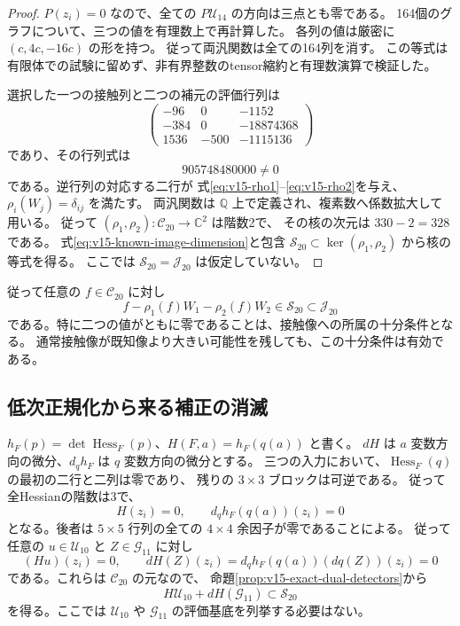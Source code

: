 \begin{proof}
$P(z_i)=0$ なので、全ての $P\mathcal U_{14}$ の方向は三点とも零である。
164個のグラフについて、三つの値を有理数上で再計算した。
各列の値は厳密に $(c,4c,-16c)$ の形を持つ。
従って両汎関数は全ての164列を消す。
この等式は有限体での試験に留めず、非有界整数のtensor縮約と有理数演算で検証した。

選択した一つの接触列と二つの補元の評価行列は
\[
 \begin{pmatrix}
 -96&0&-1152\\
 -384&0&-18874368\\
 1536&-500&-1115136
 \end{pmatrix}
\]
であり、その行列式は
\[
 905748480000\ne0
\]
である。逆行列の対応する二行が
式\eqref{eq:v15-rho1}--\eqref{eq:v15-rho2}を与え、
$\rho_i(W_j)=\delta_{ij}$ を満たす。
両汎関数は $\mathbb Q$ 上で定義され、複素数へ係数拡大して用いる。
従って $(\rho_1,\rho_2):\mathcal C_{20}\to\mathbb C^2$ は階数2で、
その核の次元は $330-2=328$ である。
式\eqref{eq:v15-known-image-dimension}と包含
$\mathcal S_{20}\subset\ker(\rho_1,\rho_2)$ から核の等式を得る。
ここでは $\mathcal S_{20}=\mathcal J_{20}$ は仮定していない。
\end{proof}

従って任意の $f\in\mathcal C_{20}$ に対し
\[
 f-\rho_1(f)W_1-\rho_2(f)W_2\in\mathcal S_{20}\subset\mathcal J_{20}
\]
である。特に二つの値がともに零であることは、接触像への所属の十分条件となる。
通常接触像が既知像より大きい可能性を残しても、この十分条件は有効である。

\subsection{低次正規化から来る補正の消滅}

$h_F(p)=\det\operatorname{Hess}_F(p)$、$H(F,a)=h_F(q(a))$ と書く。
$dH$ は $a$ 変数方向の微分、$d_qh_F$ は $q$ 変数方向の微分とする。
三つの入力において、$\operatorname{Hess}_F(q)$ の最初の二行と二列は零であり、
残りの $3\times3$ ブロックは可逆である。
従って全Hessianの階数は3で、
\[
 H(z_i)=0,\qquad d_qh_F(q(a))(z_i)=0
\]
となる。後者は $5\times5$ 行列の全ての $4\times4$ 余因子が零であることによる。
従って任意の $u\in\mathcal U_{10}$ と $Z\in\mathcal G_{11}$ に対し
\[
 (Hu)(z_i)=0,\qquad
 dH(Z)(z_i)=d_qh_F(q(a))(dq(Z))(z_i)=0
\]
である。これらは $\mathcal C_{20}$ の元なので、
命題\ref{prop:v15-exact-dual-detectors}から
\begin{equation}\label{eq:v15-hessian-secondary-in-known-image}
 H\mathcal U_{10}+dH(\mathcal G_{11})\subset\mathcal S_{20}
\end{equation}
を得る。ここでは $\mathcal U_{10}$ や $\mathcal G_{11}$ の評価基底を列挙する必要はない。

